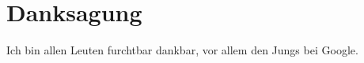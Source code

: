 \section{Danksagung}

    Ich bin allen Leuten furchtbar dankbar, vor allem den Jungs bei Google.


